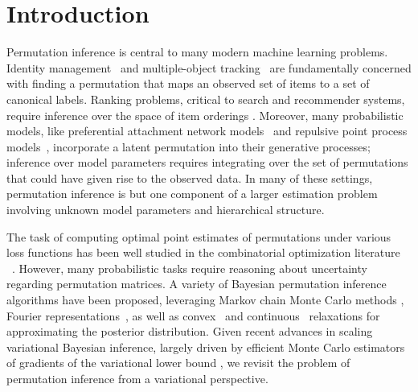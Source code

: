 \section{Introduction}

Permutation inference is central to many modern machine learning
problems.  Identity management~\citep{guibas2008identity} and
multiple-object tracking~\citep{shin2005lazy, kondor2007multi} are
fundamentally concerned with finding a permutation that maps an
observed set of items to a set of canonical labels.
Ranking problems, critical to search and recommender systems, require
inference over the space of item orderings \citep{meilua2007consensus,
  lebanon2008non, adams2011ranking}.  Moreover, many probabilistic models, like
preferential attachment network models~\citep{bloem2016random} and
repulsive point process models~\citep{rao2016bayesian}, incorporate a
latent permutation into their generative processes; inference over
model parameters requires integrating over the set of permutations
that could have given rise to the observed data.  In many of these
settings, permutation inference is but one component of a larger
estimation problem involving unknown model parameters and hierarchical
structure.

The task of computing optimal point estimates of permutations under
various loss functions has been well studied
in the combinatorial optimization literature ~\citep{kuhn1955hungarian, munkres1957algorithms,
  lawler1963quadratic}. However, many probabilistic tasks require reasoning
about uncertainty regarding permutation matrices.  A variety of
Bayesian permutation inference algorithms have been proposed, leveraging
Markov chain Monte Carlo methods \citep{diaconis1988group}, Fourier
representations~\citep{kondor2007multi, huang2009fourier}, as well as
convex~\citep{lim2014beyond} and
continuous~\citep{plis2011directional} relaxations for approximating
the posterior distribution.  Given recent advances in scaling
variational Bayesian inference, largely driven by efficient Monte
Carlo estimators of gradients of the variational lower bound
\citep{Kingma2014, rezende2014stochastic}, we revisit the problem of
permutation inference from a variational perspective.

